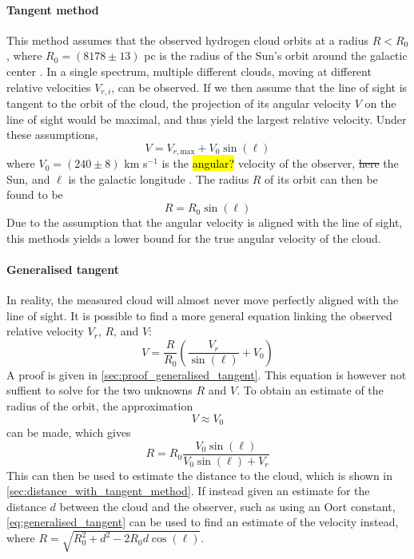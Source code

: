 \paragraph{Tangent method}
This method assumes that the observed hydrogen cloud orbits at a radius $R < R_0$, where $R_0 = (8178 \pm 13)$ pc is the radius of the Sun's orbit around the galactic center \cite{the_gravity_collaboration_geometric_2019}. In a single spectrum, multiple different clouds, moving at different relative velocities $V_{r,i}$, can be observed. If we then assume that the line of sight is tangent to the orbit of the cloud, the projection of its angular velocity $V$ on the line of sight would be maximal, and thus yield the largest relative velocity. Under these assumptions,
\begin{equation}
    V = V_{r,\textrm{max}} + V_0 \sin(\ell)
\end{equation}
where $V_0 = (240 \pm 8)$ {km s$^{-1}$} is the \hl{angular?} velocity of the observer, \st{here} the Sun, and $\ell$ is the galactic longitude \cite{reid_trigonometric_2014}. The radius $R$ of its orbit can then be found to be
\begin{equation}
    R = R_0 \sin(\ell)
\end{equation}
Due to the assumption that the angular velocity is aligned with the line of sight, this methods yields a lower bound for the true angular velocity of the cloud.

\paragraph{Generalised tangent}
In reality, the measured cloud will almost never move perfectly aligned with the line of sight. It is possible to find a more general equation linking the observed relative velocity $V_r$, $R$, and $V$:
\begin{equation}
    V = \frac{R}{R_0} \left( \frac{V_r}{\sin(\ell)} + V_0 \right)
    \label{eq:generalised_tangent}
\end{equation}
A proof is given in \autoref{sec:proof_generalised_tangent}. This equation is however not suffient to solve for the two unknowns $R$ and $V$. To obtain an estimate of the radius of the orbit, the approximation
\begin{equation}
    V \approx V_0
\end{equation}
can be made, which gives
\begin{equation}
    R = R_0 \frac{V_0 \sin(\ell)}{V_0 \sin(\ell) + V_r}
\end{equation}
This can then be used to estimate the distance to the cloud, which is shown in \autoref{sec:distance_with_tangent_method}.
If instead given an estimate for the distance $d$ between the cloud and the observer, such as using an Oort constant, \autoref{eq:generalised_tangent} can be used to find an estimate of the velocity instead, where $R = \sqrt{R_0^2 + d^2 - 2 R_0 d \cos(\ell)}$.

